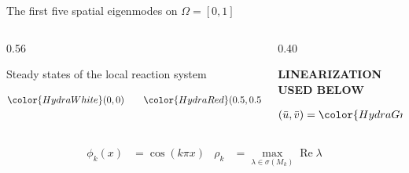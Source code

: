 \begin{frame}{The first five spatial eigenmodes on $\Omega=[0,1]$}

  \vspace{-0.34cm}

  \begin{columns}[c,onlytextwidth]

    \begin{column}{0.56\textwidth}
      {\color{HydraMuted}\fontsize{7.5}{9.2}\selectfont
        Steady states of the local reaction system
      \par}

      \vspace{-0.36cm}

      {\color{HydraWhite}\fontsize{9.0}{11.4}\selectfont
      \begin{align*}
        {\color{HydraWhite}(0,0)}
        \qquad
        {\color{HydraRed}(0.5,0.5)}
        \qquad
        {\color{HydraGreen}(1,2)}
      \end{align*}
      }
    \end{column}

    \begin{column}{0.40\textwidth}
      {\color{HydraGold}\bfseries\fontsize{7.5}{9.2}\selectfont
        LINEARIZATION USED BELOW\par}

      \vspace{-0.36cm}

      {\color{HydraWhite}\bfseries\fontsize{9.2}{11.7}\selectfont
      \begin{align*}
        (\bar u,\bar v)={\color{HydraGreen}(1,2)}
      \end{align*}
      }
    \end{column}

  \end{columns}

  \vspace{-0.40cm}

  {\color{HydraWhite}\fontsize{8.8}{11.1}\selectfont
  \begin{align*}
    \phi_k(x)
    &=
    \cos(k\pi x)
    &
    \rho_k
    &=
    \max_{\lambda\in\sigma(M_k)}\operatorname{Re}\lambda
  \end{align*}
  }

  \vspace{-0.48cm}

  \begin{columns}[c,onlytextwidth]


\end{columns}
\end{frame}
